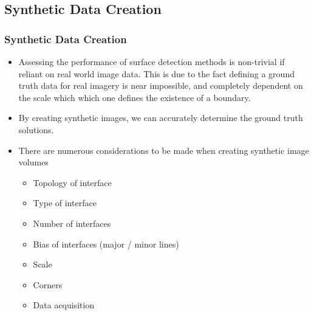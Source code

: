 \documentclass[9pt]{beamer}
\begin{document}
	\subsection{Synthetic Data Creation}
	\begin{frame}
	\frametitle{Synthetic Data Creation}
	\begin{itemize}
\item Assessing the performance of surface detection methods is non-trivial if reliant on real world image data. This is due to the fact defining a ground truth data for real imagery is near impossible, and completely dependent on the scale which which one defines the existence of a boundary.

\item By creating synthetic images, we can accurately determine the ground truth solutions.
	
	\item There are numerous considerations to be made when creating synthetic image volumes
	\begin{itemize}
	\item Topology of interface 
	\item Type of interface
	\item Number of interfaces
	\item Bias of interfaces (major / minor lines)
	\item Scale
	\item Corners
	\item Data acquisition
	\end{itemize}
	\end{itemize}
	\end{frame}
	
\end{document}
